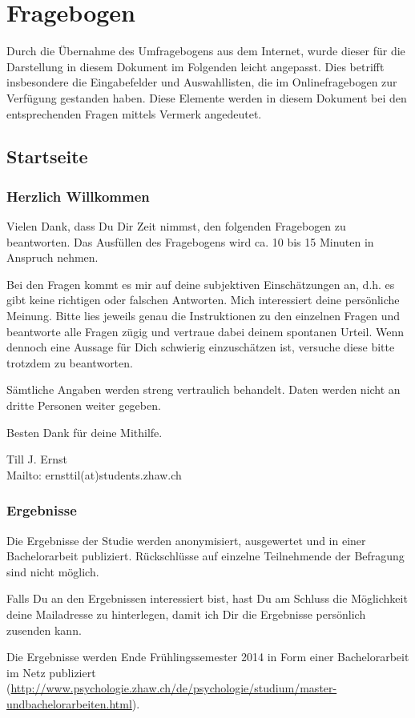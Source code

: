 \section{Fragebogen}\label{chap.appendix_fragebogen}
Durch die Übernahme des Umfragebogens aus dem Internet, wurde dieser für die Darstellung in diesem Dokument im Folgenden leicht angepasst. Dies betrifft insbesondere die Eingabefelder und Auswahllisten, die im Onlinefragebogen zur Verfügung gestanden haben. Diese Elemente werden in diesem Dokument bei den entsprechenden Fragen mittels Vermerk angedeutet.
\subsection{Startseite}\label{anhangSesction.Startseite}
\subsubsection{Herzlich Willkommen}
Vielen Dank, dass Du Dir Zeit nimmst, den folgenden Fragebogen zu beantworten. Das Ausfüllen des Fragebogens wird ca. 10 bis 15 Minuten in Anspruch nehmen.\par
Bei den Fragen kommt es mir auf deine subjektiven Einschätzungen an, d.h. es gibt keine richtigen oder falschen Antworten. Mich interessiert deine persönliche Meinung. Bitte lies jeweils genau die Instruktionen zu den einzelnen Fragen und beantworte alle Fragen zügig und vertraue dabei deinem spontanen Urteil. Wenn dennoch eine Aussage für Dich schwierig einzuschätzen ist, versuche diese bitte trotzdem zu beantworten. \par
Sämtliche Angaben werden streng vertraulich behandelt. Daten werden nicht an dritte Personen weiter gegeben. \par
Besten Dank für deine Mithilfe.\par
Till J. Ernst\\
Mailto: ernsttil(at)students.zhaw.ch
\subsubsection{Ergebnisse}
Die Ergebnisse der Studie werden anonymisiert, ausgewertet und in einer Bachelorarbeit publiziert. Rückschlüsse auf einzelne Teilnehmende der Befragung sind nicht möglich.\par
Falls Du an den Ergebnissen interessiert bist, hast Du am Schluss die Möglichkeit deine Mailadresse zu hinterlegen, damit ich Dir die Ergebnisse persönlich zusenden kann. \par
Die Ergebnisse werden Ende Frühlingssemester 2014 in Form einer Bachelorarbeit im Netz publiziert (\url{http://www.psychologie.zhaw.ch/de/psychologie/studium/master-undbachelorarbeiten.html}).
